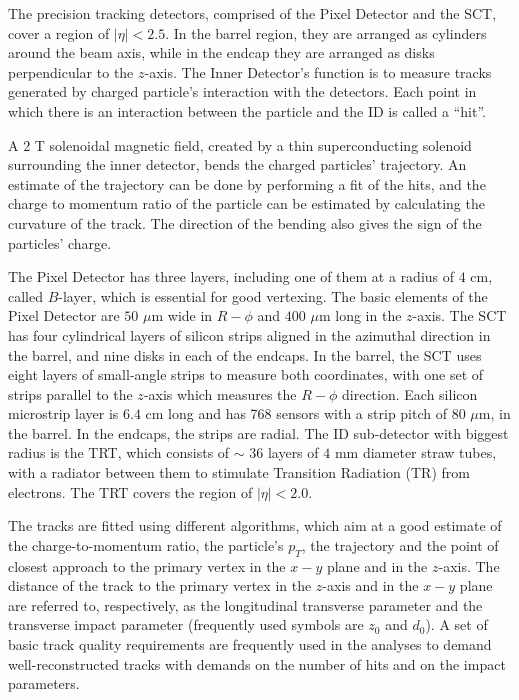 The precision tracking detectors, comprised of the Pixel Detector and the SCT, cover a region of $|\eta| < 2.5$.
In the barrel region, they are arranged as cylinders around the beam axis, while in the endcap they are arranged as disks perpendicular to the $z$-axis.
The Inner Detector's function is to measure tracks generated
by charged particle's interaction with the detectors.
Each point in which there is an interaction between the particle and the ID is called a ``hit''.

A $2$ T solenoidal magnetic field, created by a thin superconducting solenoid surrounding the inner detector,
bends the charged particles' trajectory.
An estimate of the trajectory
can be done by performing a fit of the hits, and the charge to momentum
ratio of the particle can be estimated by calculating the curvature of the
track. The direction of the bending also gives the sign of the particles'
charge.

The Pixel Detector has three layers, including one of them at a radius of $4$ cm, called $B$-layer, which
is essential for good vertexing. The basic elements of the Pixel Detector are $50$ $\mu$m wide in $R - \phi$ and
$400$ $\mu$m long in the $z$-axis. The SCT has four cylindrical layers of silicon strips aligned in the azimuthal direction in the barrel,
and nine disks in each of the endcaps.
In the barrel, the SCT uses eight layers of small-angle strips to measure both coordinates, with one set of strips parallel to the $z$-axis which measures the $R - \phi$ direction.
Each silicon microstrip layer is $6.4$ cm long and has 768 sensors with a strip pitch of $80$ $\mu$m, in the barrel. In the endcaps, the strips are radial.
The ID sub-detector with biggest radius is the TRT, which consists of $\sim$ 36 layers
of $4$ mm diameter straw tubes, with a radiator between them to stimulate Transition Radiation (TR) from electrons. The TRT covers the region of $|\eta| < 2.0$.

The tracks are fitted using different algorithms, which aim at a good estimate of the charge-to-momentum ratio, the particle's $p_T$, the trajectory
and the point of closest approach to the primary vertex in the $x-y$ plane and in the $z$-axis.
The distance of the track to the primary vertex in the $z$-axis and in the $x-y$ plane are referred to, respectively, as the longitudinal
transverse parameter and the transverse impact parameter (frequently used symbols are $z_0$ and $d_0$).
A set of basic track quality requirements are frequently used in the analyses to demand
well-reconstructed tracks with demands on the number of hits and on the impact parameters.

